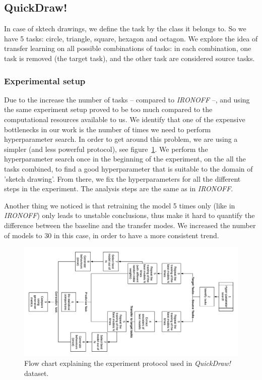   \subsection{QuickDraw!}
    \par In case of sktech drawings, we define the task by the class it belongs to. So we have 5 tasks: circle, triangle, square, hexagon and octagon. We explore the idea of transfer learning on all possible combinations of tasks: in each combination, one task is removed (the target task), and the other task are considered source tasks.

    \subsubsection{Experimental setup}
    \par Due to the increase the number of tasks -- compared to \textit{IRONOFF} --, and using the same experiment setup proved to be too much compared to the computational resources available to us. We identify that one of the expensive bottlenecks in our work is the number of times we need to perform hyperparameter search. In order to get around this problem, we are using a simpler (and less powerful protocol), see figure~\ref{fig:quickdraw_protocol}. We perform the hyperparameter search once in the beginning of the experiment, on the all the tasks combined, to find a good hyperparameter that is suitable to the domain of 'sketch drawing'. From there, we fix the hyperparameters for all the different steps in the experiment. The analysis steps are the same as in \textit{IRONOFF}.

    Another thing we noticed is that retraining the model 5 times only (like in \textit{IRONOFF}) only leads to unstable conclusions, thus make it hard to quantify the difference between the baseline and the transfer modes. We increased the number of models to 30 in this case, in order to have a more consistent trend.

    \begin{figure}
      \includegraphics[scale=0.3]{images/sota/quickdraw_results/QuickDraw_transfer_learning_flow.png}
      \caption{Flow chart explaining the experiment protocol used in \textit{QuickDraw!} dataset.}
      \label{fig:quickdraw_protocol}
    \end{figure}

